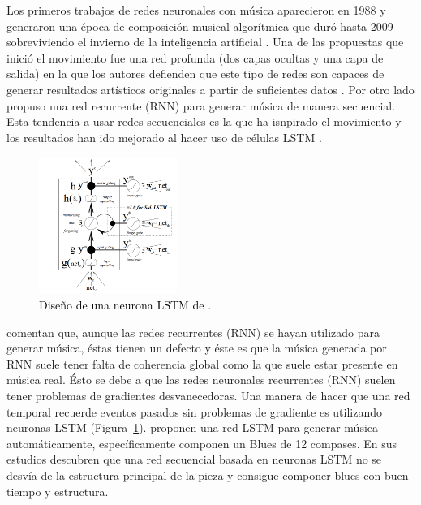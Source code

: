 \noindent Los primeros trabajos de redes neuronales con música aparecieron en 1988 y generaron una época de composición musical algorítmica que duró hasta 2009 sobreviviendo el invierno de la inteligencia artificial \citep{Pons:TowardsDataScience2018}. Una de las propuestas que inició el movimiento fue una red profunda (dos capas ocultas y una capa de salida) en la que los autores defienden que este tipo de redes son capaces de generar resultados artísticos originales a partir de suficientes datos \citep{lewis:1988}. Por otro lado \cite{Todd1988} propuso una red recurrente (RNN) para generar música de manera secuencial. Esta tendencia a usar redes secuenciales es la que ha isnpirado el movimiento \citep{Pons:TowardsDataScience2018} y los resultados han ido mejorado al hacer uso de células LSTM \citep{eck:temporalstructure:2002}.

\begin{figure}[htb]
  \centering
  \includegraphics[width=0.4\textwidth]{Figures/lstm_cell.png}
  \caption{\textcolor{black}{Diseño de una neurona LSTM de \cite{Gers2000LearningTF,Gers2001LSTM}}.}
  \label{Fig:lstm_cell}
\end{figure}

\cite{eck:temporalstructure:2002} comentan que, aunque las redes recurrentes (RNN) se hayan utilizado para generar música, éstas tienen un defecto y éste es que la música generada por RNN suele tener falta de coherencia global como la que suele estar presente en música real. Ésto se debe a que las redes neuronales recurrentes (RNN) suelen tener problemas de gradientes desvanecedoras. Una manera de hacer que una red temporal recuerde eventos pasados sin problemas de gradiente es utilizando neuronas LSTM (Figura~\ref{Fig:lstm_cell}). \cite{eck:temporalstructure:2002} proponen una red LSTM para generar música automáticamente, específicamente componen un Blues de 12 compases. En sus estudios descubren que una red secuencial basada en neuronas LSTM no se desvía de la estructura principal de la pieza y consigue componer blues con buen tiempo y estructura.

